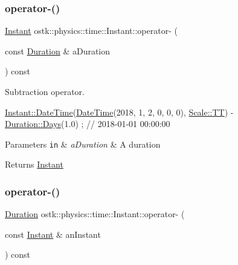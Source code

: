 \subsubsection{\texorpdfstring{operator-\/()}{operator-()}\hspace{0.1cm}{\footnotesize\ttfamily [1/2]}}
{\footnotesize\ttfamily \hyperlink{classostk_1_1physics_1_1time_1_1_instant}{Instant} ostk\+::physics\+::time\+::\+Instant\+::operator-\/ (\begin{DoxyParamCaption}\item[{const \hyperlink{classostk_1_1physics_1_1time_1_1_duration}{Duration} \&}]{a\+Duration }\end{DoxyParamCaption}) const}



Subtraction operator. 


\begin{DoxyCode}
\hyperlink{classostk_1_1physics_1_1time_1_1_instant_afd5725574a02389b80fad4baff313c8a}{Instant::DateTime}(\hyperlink{classostk_1_1physics_1_1time_1_1_instant_afd5725574a02389b80fad4baff313c8a}{DateTime}(2018, 1, 2, 0, 0, 0), 
      \hyperlink{namespaceostk_1_1physics_1_1time_adf23d37bd8641fb76a0e98ab46a70df7adf1f3edb9115acb0a1e04209b7a9937b}{Scale::TT}) - \hyperlink{classostk_1_1physics_1_1time_1_1_duration_aefb4abc87c6957d00650228d069fa1e1}{Duration::Days}(1.0) ; \textcolor{comment}{// 2018-01-01 00:00:00}
\end{DoxyCode}



\begin{DoxyParams}[1]{Parameters}
\mbox{\tt in}  & {\em a\+Duration} & A duration \\
\hline
\end{DoxyParams}
\begin{DoxyReturn}{Returns}
\hyperlink{classostk_1_1physics_1_1time_1_1_instant}{Instant} 
\end{DoxyReturn}
\mbox{\label{classostk_1_1physics_1_1time_1_1_instant_aad77e9b8aa2ab6c2d1f18c95a91e6a8e}} 
\subsubsection{\texorpdfstring{operator-\/()}{operator-()}\hspace{0.1cm}{\footnotesize\ttfamily [2/2]}}
{\footnotesize\ttfamily \hyperlink{classostk_1_1physics_1_1time_1_1_duration}{Duration} ostk\+::physics\+::time\+::\+Instant\+::operator-\/ (\begin{DoxyParamCaption}\item[{const \hyperlink{classostk_1_1physics_1_1time_1_1_instant}{Instant} \&}]{an\+Instant }\end{DoxyParamCaption}) const}



